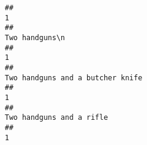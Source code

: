 \documentclass[
]{article}
\begin{document}
\begin{verbatim}
##                                                                                                                                                                                                                                                                                                                                                                                                     1 
##                                                                                                                                                                                                                                                                                                                                                                                        Two handguns\n 
##                                                                                                                                                                                                                                                                                                                                                                                                     1 
##                                                                                                                                                                                                                                                                                                                                                                      Two handguns and a butcher knife 
##                                                                                                                                                                                                                                                                                                                                                                                                     1 
##                                                                                                                                                                                                                                                                                                                                                                              Two handguns and a rifle 
##                                                                                                                                                                                                                                                                                                                                                                                                     1 

\end{verbatim}
\end{document}
